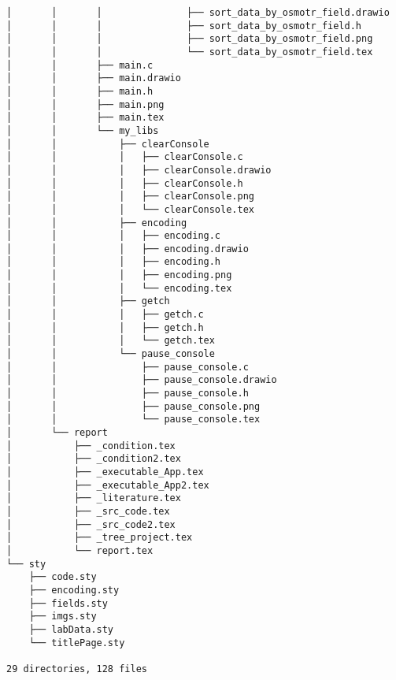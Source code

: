 \begin{verbatim}
│       │       │               ├── sort_data_by_osmotr_field.drawio
│       │       │               ├── sort_data_by_osmotr_field.h
│       │       │               ├── sort_data_by_osmotr_field.png
│       │       │               └── sort_data_by_osmotr_field.tex
│       │       ├── main.c
│       │       ├── main.drawio
│       │       ├── main.h
│       │       ├── main.png
│       │       ├── main.tex
│       │       └── my_libs
│       │           ├── clearConsole
│       │           │   ├── clearConsole.c
│       │           │   ├── clearConsole.drawio
│       │           │   ├── clearConsole.h
│       │           │   ├── clearConsole.png
│       │           │   └── clearConsole.tex
│       │           ├── encoding
│       │           │   ├── encoding.c
│       │           │   ├── encoding.drawio
│       │           │   ├── encoding.h
│       │           │   ├── encoding.png
│       │           │   └── encoding.tex
│       │           ├── getch
│       │           │   ├── getch.c
│       │           │   ├── getch.h
│       │           │   └── getch.tex
│       │           └── pause_console
│       │               ├── pause_console.c
│       │               ├── pause_console.drawio
│       │               ├── pause_console.h
│       │               ├── pause_console.png
│       │               └── pause_console.tex
│       └── report
│           ├── _condition.tex
│           ├── _condition2.tex
│           ├── _executable_App.tex
│           ├── _executable_App2.tex
│           ├── _literature.tex
│           ├── _src_code.tex
│           ├── _src_code2.tex
│           ├── _tree_project.tex
│           └── report.tex
└── sty
    ├── code.sty
    ├── encoding.sty
    ├── fields.sty
    ├── imgs.sty
    ├── labData.sty
    └── titlePage.sty

29 directories, 128 files
\end{verbatim}